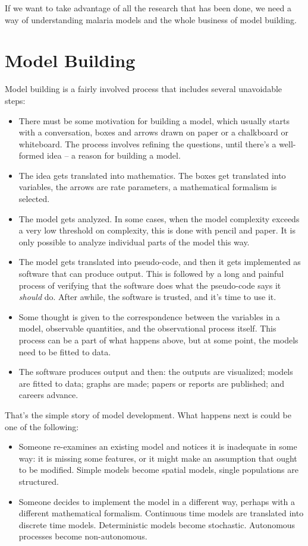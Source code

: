 \documentclass[
]{book}
\begin{document}
If we want to take advantage of all the research that has been done, we need a way of understanding malaria models and the whole business of model building.

\section{Model Building}\label{model-building-1}

Model building is a fairly involved process that includes several unavoidable steps:

\begin{itemize}
\item
  There must be some motivation for building a model, which usually starts with a conversation, boxes and arrows drawn on paper or a chalkboard or whiteboard. The process involves refining the questions, until there's a well-formed idea -- a reason for building a model.
\item
  The idea gets translated into mathematics. The boxes get translated into variables, the arrows are rate parameters, a mathematical formalism is selected.
\item
  The model gets analyzed. In some cases, when the model complexity exceeds a very low threshold on complexity,
  this is done with pencil and paper. It is only possible to analyze individual parts of the model this way.
\item
  The model gets translated into pseudo-code, and then it gets implemented as software that can produce output. This is followed by a long and painful process of verifying that the software does what the pseudo-code says it \emph{should} do. After awhile, the software is trusted, and it's time to use it.
\item
  Some thought is given to the correspondence between the variables in a model, observable quantities, and the observational process itself. This process can be a part of what happens above, but at some point, the models need to be fitted to data.
\item
  The software produces output and then: the outputs are visualized; models are fitted to data; graphs are made; papers or reports are published; and careers advance.
\end{itemize}

That's the simple story of model development. What happens next is could be one of the following:

\begin{itemize}
\item
  Someone re-examines an existing model and notices it is inadequate in some way: it is missing some features, or it might make an assumption that ought to be modified. Simple models become spatial models, single populations are structured.
\item
  Someone decides to implement the model in a different way, perhaps with a different mathematical formalism. Continuous time models are translated into discrete time models. Deterministic models become stochastic. Autonomous processes become non-autonomous.
\end{itemize}
\end{document}
